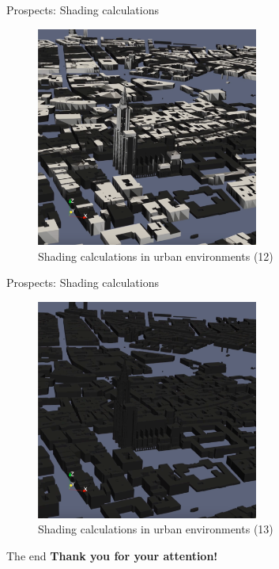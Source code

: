 \documentclass[10pt]{beamer}
\begin{document}
\begin{frame}{Prospects: Shading calculations}
  \begin{figure}
      \centering
      \includegraphics[width=0.65\textwidth]{images/shading-12.png}
      \caption{Shading calculations in urban environments (12)}
  \end{figure}
\end{frame}

\begin{frame}{Prospects: Shading calculations}
  \begin{figure}
      \centering
      \includegraphics[width=0.65\textwidth]{images/shading-13.png}
      \caption{Shading calculations in urban environments (13)}
  \end{figure}
\end{frame}

\begin{frame}{The end}
  \Large
  \centering
  \textbf{Thank you for your attention!}
\end{frame}



\nocite{*}


\end{document}
